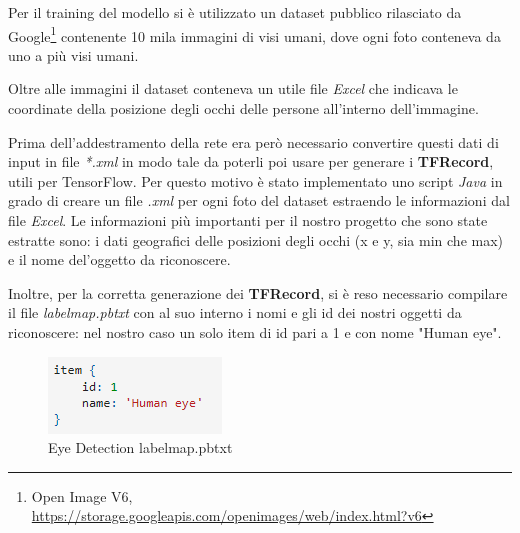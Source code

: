 Per il training del modello si è utilizzato un dataset pubblico rilasciato da Google\footnote{Open Image V6, \url{https://storage.googleapis.com/openimages/web/index.html?v6}} contenente 10 mila immagini di visi umani, dove ogni foto conteneva da uno a più visi umani.

Oltre alle immagini il dataset conteneva un utile file \textit{Excel} che indicava le coordinate della posizione degli occhi delle persone all'interno dell'immagine.

Prima dell'addestramento della rete era però necessario convertire questi dati di input in file \textit{*.xml} in modo tale da poterli poi usare per generare i \textbf{TFRecord}, utili per TensorFlow. Per questo motivo è stato implementato uno script \textit{Java} in grado di creare un file \textit{.xml} per ogni foto del dataset estraendo le informazioni dal file \textit{Excel}. Le informazioni più importanti per il nostro progetto che sono state estratte sono: i dati geografici delle posizioni degli occhi (x e y, sia min che max) e il nome del'oggetto da riconoscere.

Inoltre, per la corretta generazione dei \textbf{TFRecord}, si è reso necessario compilare il file \textit{labelmap.pbtxt} con al suo interno i nomi e gli id dei nostri oggetti da riconoscere: nel nostro caso un solo item di id pari a 1 e con nome "Human eye".

\begin{figure}[htbp]
    \centering
    \includegraphics[scale=1]{ReteNeurale/EyeDetection/Dataset/Images/eyelabelmap_item.png}
    \caption{Eye Detection labelmap.pbtxt}
    \label{fig:eyelabelmap}
\end{figure}